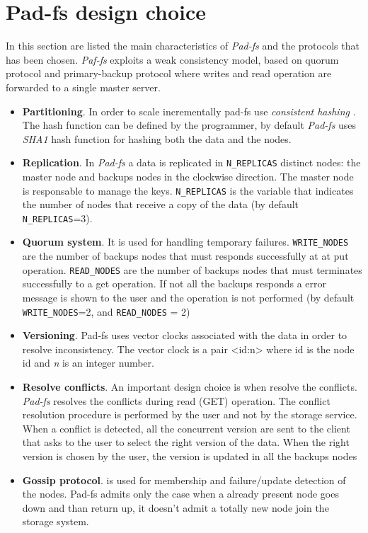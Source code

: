 \chapter {Pad-fs design choice}
In this section are listed the main characteristics of \emph{Pad-fs} and the protocols that has been chosen.  \emph{Paf-fs} exploits a weak consistency model, based on quorum protocol and primary-backup protocol where writes and read operation are forwarded to a single master server.

\begin{itemize}
\item \textbf{Partitioning}. In order to scale incrementally pad-fs use \textit{consistent hashing} . The hash function can be defined by the programmer, by default \emph{Pad-fs} uses \textit{SHA1} hash function  for hashing both the data and the nodes.

\item \textbf{Replication}. In \emph{Pad-fs} a data is replicated in \texttt{N\_REPLICAS} distinct nodes: the master node and backups nodes in the clockwise direction. The master node is responsable to manage the keys. \texttt{N\_REPLICAS} is the variable that indicates the number of nodes that receive a copy of the data (by default \texttt{N\_REPLICAS}=3).

\item \textbf{Quorum system}. It is used for handling temporary failures. \texttt{WRITE\_NODES} are the number of backups nodes that must responds successfully at at put operation. \texttt{READ\_NODES} are the number of backups nodes that must terminates successfully to a get operation. If not all the backups responds a error message is shown to the user and the operation is not performed (by default \texttt{WRITE\_NODES}=2, and  \texttt{READ\_NODES} = 2)

\item \textbf{Versioning}. Pad-fs uses vector clocks associated with the data in order to resolve inconsistency. The vector clock is a pair  <id:n>  where id is the node id and \textit{n} is an integer number. 

\item \textbf{Resolve conflicts}. An important design choice is when resolve the conflicts.
\emph{Pad-fs} resolves the conflicts during read (GET) operation. 
The conflict resolution procedure is performed by the user and not by the storage service. When a conflict is detected, all the concurrent version  are sent to the client that asks to the user to select the right version of the data. When the right version is chosen by the user, the version is updated in all the backups nodes

\item \textbf{Gossip protocol}. is used for membership and failure/update detection of the nodes. Pad-fs admits only the case when a already present node goes down and than return up, it doesn't admit a totally  new node join the storage system.

\end{itemize}
